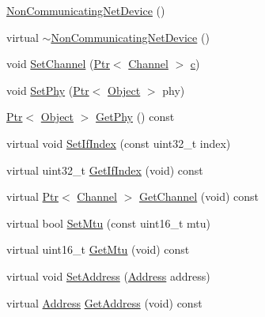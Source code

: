 \begin{DoxyCompactItemize}
\item 
\hyperlink{classns3_1_1NonCommunicatingNetDevice_a112bddfb15cafaff8c9991935e64899b}{Non\+Communicating\+Net\+Device} ()
\item 
virtual \hyperlink{classns3_1_1NonCommunicatingNetDevice_a806c13f94b7755fb6425f934f5f508c5}{$\sim$\+Non\+Communicating\+Net\+Device} ()
\item 
void \hyperlink{classns3_1_1NonCommunicatingNetDevice_a77c548e6b4d16058286dd4ca28b94427}{Set\+Channel} (\hyperlink{classns3_1_1Ptr}{Ptr}$<$ \hyperlink{classns3_1_1Channel}{Channel} $>$ \hyperlink{mmwave_2model_2fading-traces_2fading__trace__generator_8m_ae0323a9039add2978bf5b49550572c7c}{c})
\item 
void \hyperlink{classns3_1_1NonCommunicatingNetDevice_a93d7cd044809623598047c53aa255796}{Set\+Phy} (\hyperlink{classns3_1_1Ptr}{Ptr}$<$ \hyperlink{classns3_1_1Object}{Object} $>$ phy)
\item 
\hyperlink{classns3_1_1Ptr}{Ptr}$<$ \hyperlink{classns3_1_1Object}{Object} $>$ \hyperlink{classns3_1_1NonCommunicatingNetDevice_aeb42159aa05805f99c93024904a7bd7e}{Get\+Phy} () const 
\item 
virtual void \hyperlink{classns3_1_1NonCommunicatingNetDevice_a1c6ea503c3e53ba3aa45caa1c7827ae2}{Set\+If\+Index} (const uint32\+\_\+t index)
\item 
virtual uint32\+\_\+t \hyperlink{classns3_1_1NonCommunicatingNetDevice_a0a15f6546099057ae8e6e604853c391c}{Get\+If\+Index} (void) const 
\item 
virtual \hyperlink{classns3_1_1Ptr}{Ptr}$<$ \hyperlink{classns3_1_1Channel}{Channel} $>$ \hyperlink{classns3_1_1NonCommunicatingNetDevice_a90e2c861a42622507e1e09569347536a}{Get\+Channel} (void) const 
\item 
virtual bool \hyperlink{classns3_1_1NonCommunicatingNetDevice_abe5f2c3130ec064515fae9bc1a69c82e}{Set\+Mtu} (const uint16\+\_\+t mtu)
\item 
virtual uint16\+\_\+t \hyperlink{classns3_1_1NonCommunicatingNetDevice_ab2396b68f60f80c6f7e86fd1ae5e0d14}{Get\+Mtu} (void) const 
\item 
virtual void \hyperlink{classns3_1_1NonCommunicatingNetDevice_af5f0f64e19831491584dfa75956bf747}{Set\+Address} (\hyperlink{classns3_1_1Address}{Address} address)
\item 
virtual \hyperlink{classns3_1_1Address}{Address} \hyperlink{classns3_1_1NonCommunicatingNetDevice_a4fae3f01152d009654ad8adbccc03db5}{Get\+Address} (void) const 

\end{DoxyCompactItemize}
